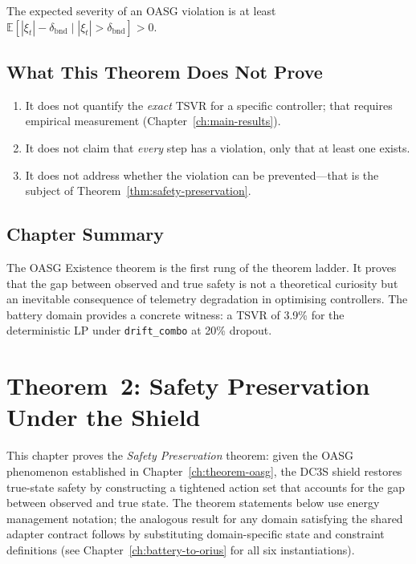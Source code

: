 \begin{corollary}
\label{cor:oasg-severity}
The expected severity of an OASG violation is at least
$\mathbb{E}[|\xi_t| - \delta_{\text{bnd}} \mid |\xi_t| > \delta_{\text{bnd}}] > 0$.
\end{corollary}

\subsection{What This Theorem Does Not Prove}

\begin{enumerate}
  \item It does not quantify the \emph{exact} TSVR for a specific
    controller; that requires empirical measurement (Chapter~\ref{ch:main-results}).
  \item It does not claim that \emph{every} step has a violation, only
    that at least one exists.
  \item It does not address whether the violation can be prevented---that
    is the subject of Theorem~\ref{thm:safety-preservation}.
\end{enumerate}

\subsection{Chapter Summary}

The OASG Existence theorem is the first rung of the theorem ladder.
It proves that the gap between observed and true safety is not a
theoretical curiosity but an inevitable consequence of telemetry
degradation in optimising controllers.  The battery domain provides
a concrete witness: a TSVR of 3.9\% for the deterministic LP under
\texttt{drift\_combo} at 20\% dropout.




\section{Theorem~2: Safety Preservation Under the Shield}
\label{ch:theorem-safety}

This chapter proves the \emph{Safety Preservation} theorem: given the
OASG phenomenon established in Chapter~\ref{ch:theorem-oasg}, the DC3S
shield restores true-state safety by constructing a tightened action set
that accounts for the gap between observed and true state.  The theorem
statements below use energy management notation; the analogous result for
any domain satisfying the shared adapter contract follows by substituting
domain-specific state and constraint definitions
(see Chapter~\ref{ch:battery-to-orius} for all six instantiations).

